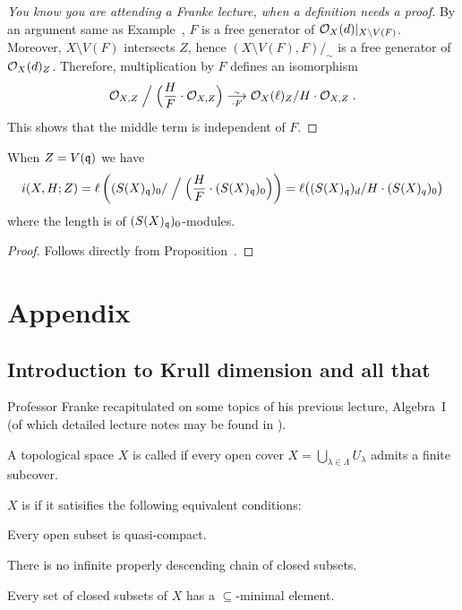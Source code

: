 \documentclass[a4paper,parskip=half,numbers=enddot, DIV=12]{scrreprt}
\begin{document}
\begin{proof}[You know you are attending a Franke lecture, when a definition needs a proof]
	By an argument same as Example~, $F$ is a free generator of $\mathcal{O}_X(d)|_{X\setminus V(F)}$. Moreover, $X\setminus V(F)$ intersects $Z$, hence $(X\setminus V(F),F)/_\sim$ is a free generator of $\mathcal{O}_X(d)_Z$. Therefore, multiplication by $F$ defines an isomorphism
	\begin{align*}
	\Oo_{X,Z} \Bigm/ \Big(\frac{H}{F}\cdot\Oo_{X,Z}\Big) \isomorphism[\cdot F] \Oo_X(\ell)_Z/H\cdot \Oo_{X,Z}\;.
	\end{align*}
	This shows that the middle term is independent of $F$.
\end{proof}
\begin{cor}
        When $Z = V(\mathfrak{q})$ we have
        \begin{align*}
            i(X,H;Z) = \ell\left((S(X)_{\mathfrak{q}})_0/\Bigm/ \Big(\frac{H}{F}\cdot(S(X)_{\mathfrak{q}})_0\Big)\right) = \ell\big((S(X)_{\mathfrak{q}})_d/H\cdot (S(X)_q)_0\big)
        \end{align*}
        where the length is of $(S(X)_{\mathfrak{q}})_0$-modules.
\end{cor}
\begin{proof}
	Follows directly from Proposition~.
\end{proof}














\appendix
\chapter{Appendix}
\setcounter{thm}{0}
\renewcommand*{\thethm}{\Alph{thm}}
\section{Introduction to Krull dimension and all that}
Professor Franke recapitulated on some topics of his previous lecture, Algebra~I (of which detailed lecture notes may be found in \cite{alg1}).
\begin{defi}
	A topological space $X$ is called  if every open cover $X = \bigcup_{\lambda\in\Lambda} U_\lambda$ admits a finite subcover.
	
	$X$ is  if it satisifies the following equivalent conditions:
	\begin{alphanumerate}
		\item Every open subset is quasi-compact.
		\item There is no infinite properly descending chain of closed subsets.
		\item Every set of closed subsets of $X$ has a $\subseteq$-minimal element.
	\end{alphanumerate}
\end{defi}
\end{document}
